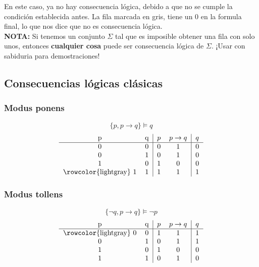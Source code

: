 \documentclass[../main.tex]{subfiles}
\begin{document}
En este caso, ya no hay consecuencia lógica, debido a que no se cumple la condición establecida antes. La fila marcada en gris, tiene un 0 en la formula final, lo que nos dice que no es consecuencia lógica.\\
\textbf{NOTA:} Si tenemos un conjunto $\Sigma$ tal que es imposible obtener una fila con solo unos, entonces \textbf{cualquier cosa} puede ser consecuencia lógica de $\Sigma$. ¡Usar con sabiduria para demostraciones!

\subsection{Consecuencias lógicas clásicas}
\subsubsection{Modus ponens}
$$ \{ p, p \rightarrow{} q \} \models{} q $$
\[
    \begin{tabular}{cc|cc|c}
        p & q & $p$ & $p \rightarrow{} q$ & $q$ \\ \hline
        0 & 0 & 0 & 1 & 0 \\
        0 & 1 & 0 & 1 & 0 \\
        1 & 0 & 1 & 0 & 0 \\
        \rowcolor{lightgray} 1 & 1 & 1 & 1 & 1 \\
    \end{tabular}
\]

\subsubsection{Modus tollens}
$$\{ \neg{} q, p \rightarrow q \} \models{} \neg{} p$$
\[
    \begin{tabular}{cc|cc|c}
        p & q & $p$ & $p \rightarrow{} q$ & $q$ \\ \hline
        \rowcolor{lightgray} 0 & 0 & 1 & 1 & 1 \\
        0 & 1 & 0 & 1 & 1 \\
        1 & 0 & 1 & 0 & 0 \\
        1 & 1 & 0 & 1 & 0 \\
    \end{tabular}
\]
\end{document}
